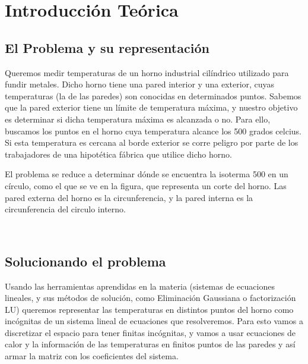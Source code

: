 \section{Introducción Teórica}

\subsection{El Problema y su representación}
Queremos medir temperaturas de un horno industrial cilíndrico utilizado para fundir metales. Dicho horno tiene una pared interior y una exterior, cuyas temperaturas (la de las paredes) son conocidas en determinados puntos. Sabemos que la pared exterior tiene un límite de temperatura máxima, y nuestro objetivo es determinar si dicha temperatura máxima es alcanzada o no. Para ello, buscamos los puntos en el horno cuya temperatura alcance los 500 grados celcius.  Si esta temperatura es cercana al borde exterior se corre peligro por parte de los trabajadores de una hipotética fábrica que utilice dicho horno.

El problema se reduce a determinar dónde se encuentra la isoterma 500 en un círculo, como el que se ve en la figura, que representa un corte del horno. Las pared externa del horno es la circunferencia, y la pared interna es la circunferencia del circulo interno.




\\


\subsection{Solucionando el problema}

Usando las herramientas aprendidas en la materia (sistemas de ecuaciones lineales, y sus métodos de solución, como Eliminación Gaussiana o factorización LU) queremos representar las temperaturas en distintos puntos del horno como incógnitas de un sistema lineal de ecuaciones que resolveremos.
 Para esto vamos a discretizar el espacio para tener finitas incógnitas, y vamos a usar ecuaciones de calor y la información de las temperaturas en finitos puntos de las paredes y así armar la matriz con los coeficientes del sistema.






